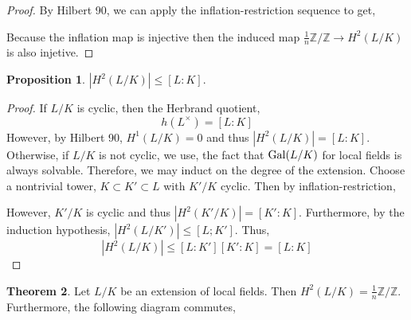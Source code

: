 \documentclass[12pt]{extarticle}
\newcommand{\Z}{\mathbb{Z}}
\theoremstyle{definition}
\newtheorem{theorem}{Theorem}[section]
\newtheorem{proposition}[theorem]{Proposition}
\begin{document}
\begin{proof}
By Hilbert 90, we can apply the inflation-restriction sequence to get,
\begin{center}
\end{center}
Because the inflation map is injective then the induced map $\tfrac{1}{n} \Z / \Z \to H^2(L/K)$ is also injetive. 
\end{proof}

\begin{proposition}
$|H^2(L/K)| \le [L : K]$. 
\end{proposition}

\begin{proof}
If $L / K$ is cyclic, then the Herbrand quotient,
\[ h(L^\times) = [L : K] \]
However, by Hilbert 90, $H^1(L/K) = 0$ and thus $|H^2(L / K)| = [L : K]$. Otherwise, if $L / K$ is not cyclic, we use, the fact that $\mathrm{Gal} (L/K)$ for local fields is always solvable. Therefore, we may induct on the degree of the extension. Choose a nontrivial tower, $K \subset K' \subset L$ with $K' / K$ cyclic. Then by inflation-restriction,
\begin{center}
\end{center} 
However, $K' / K$ is cyclic and thus $|H^2(K' / K)| = [K' : K]$. Furthermore, by the induction hypothesis, $|H^2(L / K')| \le [L ; K']$. Thus,
\[ |H^2(L / K) | \le [L : K'] [K' : K]  = [L  : K] \]  
\end{proof}

\begin{theorem}
Let $L / K$ be an extension of local fields. Then $H^2(L/K) = \tfrac{1}{n} \Z / \Z$. Furthermore, the following diagram commutes,
\begin{center}
\end{center}
\end{theorem}
\end{document}
